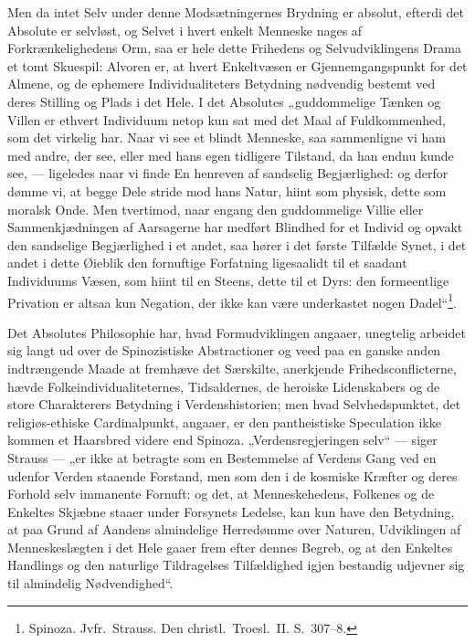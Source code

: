\documentclass[12pt]{book}
\begin{document}
Men da intet Selv under denne Modsætningernes Brydning er absolut,
efterdi det Absolute er selvløst, og Selvet i hvert enkelt Menneske
nages af Forkrænkelighedens Orm, saa er hele dette Frihedens og
Selvudviklingens Drama et tomt Skuespil: Alvoren er, at hvert
Enkeltvæsen er Gjennemgangspunkt for det Almene, og de ephemere
Individualiteters Betydning nødvendig bestemt ved deres Stilling og
Plads i det Hele. I det Absolutes „guddommelige Tænken og Villen er
ethvert Individuum netop kun sat med det Maal af Fuldkommenhed, som
det virkelig har. Naar vi see et blindt Menneske, saa sammenligne vi
ham med andre, der see, eller med hans egen tidligere Tilstand, da
han endnu kunde see, --- ligeledes naar vi finde En henreven af
sandselig Begjærlighed: og derfor dømme vi, at begge Dele stride mod
hans Natur, hiint som physisk, dette som moralsk Onde. Men
tvertimod, naar engang den guddommelige Villie eller
Sammenkjædningen af Aarsagerne har medført
Blindhed for et Individ og opvakt den sandselige Begjærlighed i et
andet, saa hører i det første Tilfælde Synet, i det andet i dette
Øieblik den fornuftige Forfatning ligesaalidt til et saadant
Individuums Væsen, som hiint til en Steens, dette til et Dyrs: den
formeentlige Privation er altsaa kun Negation, der ikke kan være
underkastet nogen Dadel“\footnote{Spinoza. Jvfr.\ Strauss. Den
christl.\ Troesl.\ II. S.\ 307--8.}.

Det Absolutes Philosophie har, hvad Formudviklingen angaaer,
unegtelig arbeidet sig langt ud over de Spinozistiske Abstractioner
og veed paa en ganske anden indtrængende Maade at fremhæve det
Særskilte, anerkjende Frihedsconflicterne, hævde
Folkeindividualiteternes, Tidsaldernes, de heroiske Lidenskabers og
de store Charakterers Betydning i Verdenshistorien; men hvad
Selvhedspunktet, det religiøs-ethiske Cardinalpunkt, angaaer, er den
pantheistiske Speculation ikke kommen et Haarsbred videre end
Spinoza. „Verdensregjeringen selv“ --- siger Strauss --- „er ikke at
betragte som en Bestemmelse af Verdens Gang ved en udenfor Verden
staaende Forstand, men som den i de kosmiske Kræfter og deres
Forhold selv immanente Fornuft: og det, at Menneskehedens, Folkenes
og de Enkeltes Skjæbne staaer under Forsynets Ledelse, kan kun have
den Betydning, at paa Grund af Aandens almindelige Herredømme over
Naturen, Udviklingen af Menneskeslægten i det Hele gaaer frem efter
dennes Begreb, og at den Enkeltes Handlings og den naturlige
Tildragelses Tilfældighed igjen bestandig udjevner sig til
almindelig Nødvendighed“.
\end{document}
